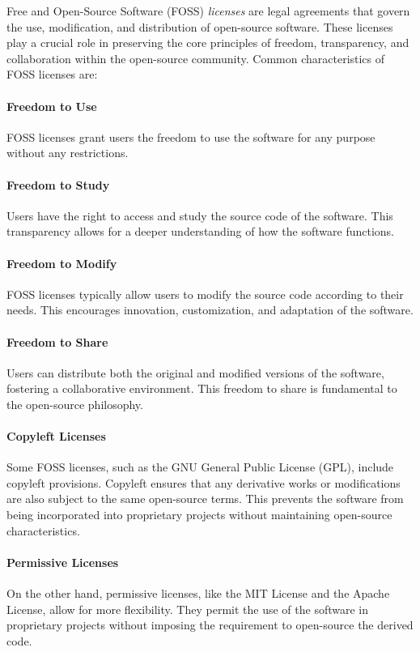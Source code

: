 \begin{withcode}
Free and Open-Source Software (FOSS) \emph{licenses} are legal agreements that govern the use, modification, and distribution of open-source software. These licenses play a crucial role in preserving the core principles of freedom, transparency, and collaboration within the open-source community. Common characteristics of FOSS licenses are:

\paragraph*{Freedom to Use} FOSS licenses grant users the freedom to use the software for any purpose without any restrictions.

\paragraph*{Freedom to Study} Users have the right to access and study the source code of the software. This transparency allows for a deeper understanding of how the software functions.

\paragraph*{Freedom to Modify} FOSS licenses typically allow users to modify the source code according to their needs. This encourages innovation, customization, and adaptation of the software.

\paragraph*{Freedom to Share} Users can distribute both the original and modified versions of the software, fostering a collaborative environment. This freedom to share is fundamental to the open-source philosophy.

\paragraph*{Copyleft Licenses} Some FOSS licenses, such as the GNU General Public License (GPL), include copyleft provisions. Copyleft ensures that any derivative works or modifications are also subject to the same open-source terms. This prevents the software from being incorporated into proprietary projects without maintaining open-source characteristics.

\paragraph*{Permissive Licenses} On the other hand, permissive licenses, like the MIT License and the Apache License, allow for more flexibility. They permit the use of the software in proprietary projects without imposing the requirement to open-source the derived code.


\end{withcode}
